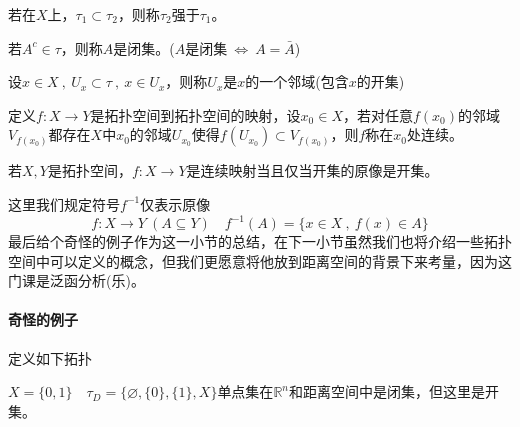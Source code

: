 若在$X$上，$\tau_1 \subset \tau_2$，则称$\tau_2$强于$\tau_1$。
\begin{definition}[闭集]
    若$A^c \in \tau$，则称$A$是闭集。($A$是闭集$\ \Leftrightarrow \ A=\bar{A}$)
\end{definition}
\begin{definition}[邻域]
    设$x \in X \ , \ U_x \subset \tau \ , \ x \in U_x$，则称$U_x$是$x$的一个邻域(包含$x$的开集)
\end{definition}
\begin{definition}[连续]
    定义$f:X \to Y$是拓扑空间到拓扑空间的映射，设$x_0 \in X$，若对任意$f(x_0)$的邻域$V_{f(x_0)}$都存在$X$中$x_0$的邻域$U_{x_0}$使得$f(U_{x_0}) \subset V_{f(x_0)}$，则$f$称在$x_0$处连续。
\end{definition}
\begin{theorem}
    若$X,Y$是拓扑空间，$f:X \to Y$是连续映射当且仅当开集的原像是开集。
\end{theorem}
这里我们规定符号$f^{-1}$仅表示原像
\[f:X \to Y \ (A \subseteq Y) \quad f^{-1}(A)=\{x \in X \ , \ f(x) \in A\}\]
最后给个奇怪的例子作为这一小节的总结，在下一小节虽然我们也将介绍一些拓扑空间中可以定义的概念，但我们更愿意将他放到距离空间的背景下来考量，因为这门课是泛函分析(乐)。
\paragraph*{奇怪的例子} 定义如下拓扑

$X=\{0,1\} \quad \tau_D=\{\varnothing,\{0\},\{1\},X\}$单点集在$\mathbb{R}^n$和距离空间中是闭集，但这里是开集。

